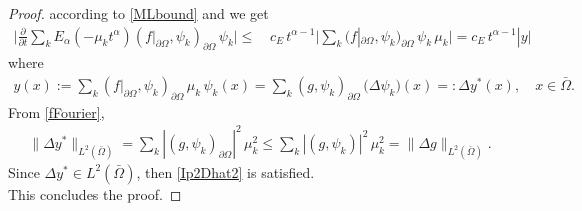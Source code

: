 \documentclass[11pt,a4paper]{article}
\begin{document}
\begin{proof}
according to \eqref{MLbound} and \cite[equation (17)]{Kra03} we get
\begin{align*}
\Big| \frac{\partial}{\partial t} \sum_k E_\alpha(-\mu_k t^\alpha) (f|_{\partial \Omega}, \psi_k)_{\partial \Omega}\, \psi_k \Big| \leq & \, c_E\,  t^{\alpha-1} \Big| \sum_k  (f|_{\partial \Omega}, \psi_k)_{\partial \Omega}\, \psi_k \, \mu_k \Big| = c_E\, t^{\alpha-1} |y|
\end{align*}
where
\begin{align*}
y(x) := \sum_k  (f|_{\partial \Omega}, \psi_k)_{\partial \Omega}\, \mu_k\, \psi_k(x) = \sum_k  (g, \psi_k)_{\partial \Omega}\, \big(\Delta \psi_k\big)(x) =:\Delta y^*(x), \quad x \in \bar{\Omega}.
\end{align*}
From \eqref{fFourier}, 
\begin{align}
\|\Delta y^* \|_{L^2(\bar{\Omega})} = \sum_k  |(g, \psi_k)_{\partial \Omega}|^2\, \mu^2_k \leq \sum_k  |(g, \psi_k)|^2\, \mu^2_k = \|\Delta g \|_{L^2(\bar{\Omega})}.
\label{normL2y}  
\end{align}
Since $\Delta y^* \in L^2(\bar{\Omega})$, then \eqref{Ip2Dhat2} is satisfied. \\

This concludes the proof.
\end{proof}
\end{document}
